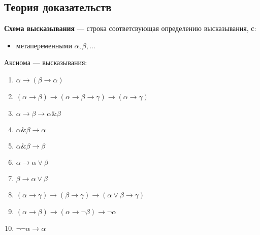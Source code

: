 \documentclass[english]{article}
\begin{document}
\subsection{Теория доказательств}
\label{sec:orgdfac5b9}
\begin{definition}
	\textbf{Схема высказывания} --- строка соответсвующая определению высказывания, с:
	\begin{itemize}
		\item метапеременными \(\alpha, \beta, \dots\)
	\end{itemize}
\end{definition}
\begin{definition}
	Аксиома --- высказывания:
	\begin{enumerate}
		\item \(\alpha \to (\beta \to \alpha)\)
		\item \((\alpha \to \beta) \to (\alpha \to \beta \to \gamma) \to (\alpha \to \gamma)\)
		\item \(\alpha \to \beta \to \alpha \& \beta\)
		\item \(\alpha \& \beta \to \alpha\)
		\item \(\alpha \& \beta \to \beta\)
		\item \(\alpha \to \alpha \vee \beta\)
		\item \(\beta \to \alpha \vee \beta\)
		\item \((\alpha \to \gamma) \to (\beta \to \gamma) \to (\alpha \vee \beta \to \gamma)\)
		\item \((\alpha \to \beta) \to (\alpha \to \neg \beta) \to \neg \alpha\)
		\item \(\neg\neg \alpha \to \alpha\)
	\end{enumerate}
\end{definition}
\end{document}
